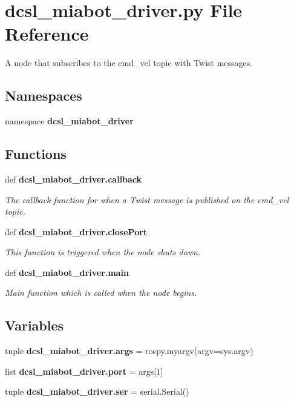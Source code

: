 \section{dcsl\-\_\-miabot\-\_\-driver.\-py \-File \-Reference}
\label{dcsl__miabot__driver_8py}


\-A node that subscribes to the cmd\-\_\-vel topic with \-Twist messages.  


\subsection*{\-Namespaces}
\begin{DoxyCompactItemize}
\item 
namespace {\bf dcsl\-\_\-miabot\-\_\-driver}
\end{DoxyCompactItemize}
\subsection*{\-Functions}
\begin{DoxyCompactItemize}
\item 
def {\bf dcsl\-\_\-miabot\-\_\-driver.\-callback}
\begin{DoxyCompactList}\small\item\em \-The callback function for when a \-Twist message is published on the cmd\-\_\-vel topic. \end{DoxyCompactList}\item 
def {\bf dcsl\-\_\-miabot\-\_\-driver.\-close\-Port}
\begin{DoxyCompactList}\small\item\em \-This function is triggered when the node shuts down. \end{DoxyCompactList}\item 
def {\bf dcsl\-\_\-miabot\-\_\-driver.\-main}
\begin{DoxyCompactList}\small\item\em \-Main function which is called when the node begins. \end{DoxyCompactList}\end{DoxyCompactItemize}
\subsection*{\-Variables}
\begin{DoxyCompactItemize}
\item 
tuple {\bf dcsl\-\_\-miabot\-\_\-driver.\-args} = rospy.\-myargv(argv=sys.\-argv)
\item 
list {\bf dcsl\-\_\-miabot\-\_\-driver.\-port} = args[1]
\item 
tuple {\bf dcsl\-\_\-miabot\-\_\-driver.\-ser} = serial.\-Serial()
\end{DoxyCompactItemize}


